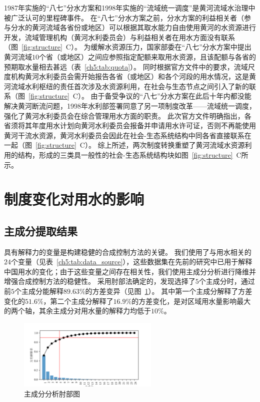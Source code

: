 1987年实施的“八七”分水方案和1998年实施的“流域统一调度”是黄河流域水治理中被广泛认可的里程碑事件。
在“八七”分水方案之前，分水方案的利益相关者（参与分水的黄河流域各省份或地区）可以根据其取水能力自由使用黄河的水资源进行开发，流域管理机构（黄河水利委员会）与利益相关者在用水方面没有联系（图~\ref{fig:structure}~C）。
为缓解水资源压力，国家部委在“八七”分水方案中提出黄河流域$10$个省（或地区）之间应参照指定配额来取用水资源，且该配额与各省的预期取水量相去甚远（表~\ref{ch5:tab:quota}）。
同时根据官方文件中的要求，流域尺度机构黄河水利委员会需开始报告各省（或地区）和各个河段的用水情况，这是黄河流域水利枢纽的责任首次涉及水资源利用，在社会与生态节点之间引入了新的联系（图~\ref{fig:structure}~C）。
由于备受争议的“八七”分水方案在此后十年内都没能解决黄河断流问题，1998年水利部签署同意了另一项制度改革——流域统一调度，强化了黄河水利委员会在综合管理用水方面的职责。
此次官方文件明确指出，各省须将其年度用水计划向黄河水利委员会报备并申请用水许可证，否则不再能使用黄河干流水资源，黄河水利委员会因此在社会-生态系统结构中同各省直接联系在一起（图~\ref{fig:structure}~C）。
综上所述，两次制度转换重塑了黄河流域水资源利用的结构，形成的三类具一般性的社会-生态系统结构块如图~\ref{fig:structure}~C所示。



\section{制度变化对用水的影响}

\subsection{主成分提取结果}

具有解释力的变量是构建稳健的合成控制方法的关键。
我们使用了与用水相关的$24$个变量（见表~\ref{ch5:tab:data_source}），这些数据集在先前的研究中已用于解释中国用水的变化\cite{zhou2020}；由于这些变量之间存在相关性，我们使用主成分分析进行降维并增强合成控制方法的稳健性。
采用肘部法确定的，发现选择了$5$个主成分时，通过前$5$个主成分能解释$89.63\%$的方差变异（见图~\ref{ch5:fig:elbow}）。
其中第一个主成分解释了方差变化的$51.6\%$，第二个主成分解释了$16.9\%$的方差变化，是对区域用水量影响最大的两个轴，其余主成分对用水量的解释力均低于$10\%$。

\begin{figure}[htb]
    \centering
    \includegraphics[width=0.6\textwidth]{img/ch5/ch5_elbow.png}
    \caption{主成分分析肘部图}\label{ch5:fig:elbow}
\end{figure}

